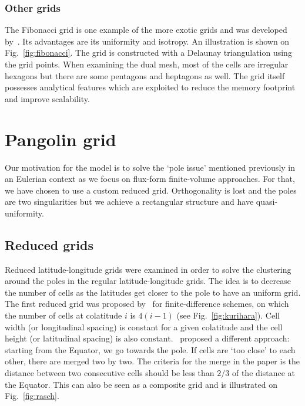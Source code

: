 \subsubsection{Other grids}
The Fibonacci grid is one example of the more exotic grids and was developed
by~\cite{Swinbank2006}. Its advantages are its uniformity and isotropy. An
illustration is shown on Fig.~\ref{fig:fibonacci}.
The grid is constructed with a Delaunay triangulation using the grid points.
When examining the dual mesh, most of the cells are irregular hexagons but there
are some pentagons and heptagons as well. The grid itself possesses analytical
features which are exploited to reduce the memory footprint and improve
scalability.

\section{Pangolin grid}
\label{subsec:pango_grid}
Our motivation for the model is to solve the `pole issue' mentioned previously
in an Eulerian context as we focus on flux-form finite-volume approaches. For
that, we have chosen to use a custom reduced grid. Orthogonality is lost and
the poles are two singularities but we achieve a rectangular structure and have
quasi-uniformity.

\subsection{Reduced grids}
Reduced latitude-longitude grids were examined in order to solve the clustering
around the poles in the regular latitude-longitude grids. The idea is to
decrease the number of cells as the latitudes get closer to the pole to
have an uniform grid. The first reduced grid was proposed by~\cite{Kurihara1965}
for finite-difference schemes, on which the number of cells at colatitude $i$ is
$4(i-1)$ (see Fig.~\ref{fig:kurihara}). Cell width (or longitudinal spacing) is
constant for a given colatitude and the cell height (or latitudinal spacing) is
also constant.~\cite{Rasch1994} proposed a different approach: starting from the
Equator, we go towards the pole. If cells are `too close' to each other, there
are merged two by two. The criteria for the merge in the paper is the distance
between two consecutive cells should be less than $2/3$ of the distance at the
Equator. This can also be seen as a composite grid and is illustrated on
Fig.~\ref{fig:rasch}.

